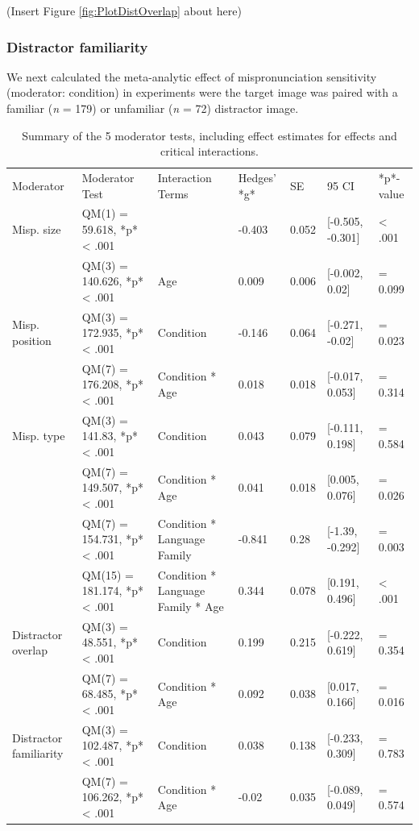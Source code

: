 \documentclass[
  man, noextraspace]{apa6}
\makeatletter
\newenvironment{lltable}{\begin{landscape}\begin{center}\begin{ThreePartTable}}{\end{ThreePartTable}\end{center}\end{landscape}}
\newcommand\LastLTentrywidth{1em}
\newlength\longtablewidth
\newcommand{\getlongtablewidth}{\begingroup \ifcsname LT@\roman{LT@tables}\endcsname \global\longtablewidth=0pt \renewcommand{\LT@entry}[2]{\global\advance\longtablewidth by ##2\relax\gdef\LastLTentrywidth{##2}}\@nameuse{LT@\roman{LT@tables}} \fi \endgroup}
\makeatother
\begin{document}
(Insert Figure \ref{fig:PlotDistOverlap} about here)

\hypertarget{distractor-familiarity}{%
\subsubsection{Distractor familiarity}\label{distractor-familiarity}}

We next calculated the meta-analytic effect of mispronunciation sensitivity (moderator: condition) in experiments were the target image was paired with a familiar (\emph{n} = 179) or unfamiliar (\emph{n} = 72) distractor image.

\begin{lltable}


\scriptsize{
\begin{longtable}{lllllll}\noalign{\getlongtablewidth\global\LTcapwidth=\longtablewidth}
\caption{\label{tab:mod_table_finalize}Summary of the 5 moderator tests, including effect estimates for effects and critical interactions.}\\
\toprule
Moderator & Moderator Test & Interaction Terms & Hedges' *g* & SE & 95 CI & *p*-value\\
\midrule
Misp. size & QM(1) = 59.618, *p* < .001 &  & -0.403 & 0.052 & [-0.505, -0.301] & < .001\\
 & QM(3) = 140.626, *p* < .001 & Age & 0.009 & 0.006 & [-0.002, 0.02] & = 0.099\\ \midrule
Misp. position & QM(3) = 172.935, *p* < .001 & Condition & -0.146 & 0.064 & [-0.271, -0.02] & = 0.023\\
 & QM(7) = 176.208, *p* < .001 & Condition * Age & 0.018 & 0.018 & [-0.017, 0.053] & = 0.314\\ \midrule
Misp. type & QM(3) = 141.83, *p* < .001 & Condition & 0.043 & 0.079 & [-0.111, 0.198] & = 0.584\\
 & QM(7) = 149.507, *p* < .001 & Condition * Age & 0.041 & 0.018 & [0.005, 0.076] & = 0.026\\
 & QM(7) = 154.731, *p* < .001 & Condition * Language Family & -0.841 & 0.28 & [-1.39, -0.292] & = 0.003\\
 & QM(15) = 181.174, *p* < .001 & Condition * Language Family * Age & 0.344 & 0.078 & [0.191, 0.496] & < .001\\ \midrule
Distractor overlap & QM(3) = 48.551, *p* < .001 & Condition & 0.199 & 0.215 & [-0.222, 0.619] & = 0.354\\
 & QM(7) = 68.485, *p* < .001 & Condition * Age & 0.092 & 0.038 & [0.017, 0.166] & = 0.016\\ \midrule
Distractor familiarity & QM(3) = 102.487, *p* < .001 & Condition & 0.038 & 0.138 & [-0.233, 0.309] & = 0.783\\
 & QM(7) = 106.262, *p* < .001 & Condition * Age & -0.02 & 0.035 & [-0.089, 0.049] & = 0.574\\
\bottomrule
\end{longtable}
}
\end{lltable}
\end{document}

